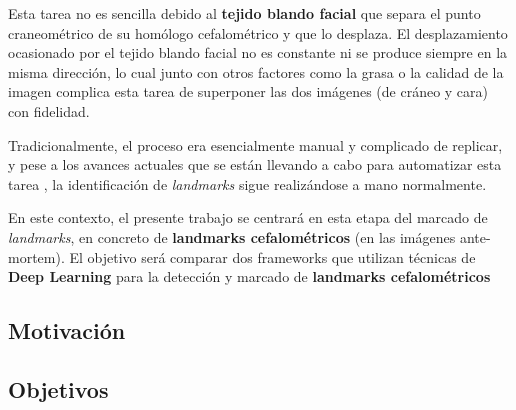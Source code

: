 \noindent Esta tarea no es sencilla debido al \textbf{tejido blando facial} que separa el punto craneométrico de su homólogo cefalométrico y que lo desplaza. El desplazamiento ocasionado por el tejido blando facial no es constante ni se produce siempre en la misma dirección, lo cual junto con otros factores como la grasa o la calidad de la imagen complica esta tarea de superponer las dos imágenes (de cráneo y cara) con fidelidad.

\medskip

\noindent Tradicionalmente, el proceso era esencialmente manual y complicado de replicar, y pese a los avances actuales que se están llevando a cabo para automatizar esta tarea \cite{Huete2015PastPA}, la identificación de \textit{landmarks} sigue realizándose a mano normalmente. 

\medskip

\noindent En este contexto, el presente trabajo se centrará en esta etapa del marcado de \textit{landmarks}, en concreto de \textbf{landmarks cefalométricos} (en las imágenes ante-mortem). El objetivo será comparar dos frameworks que utilizan técnicas de \textbf{Deep Learning} para la detección y marcado de \textbf{landmarks cefalométricos}


\subsection{Motivación}
\subsection{Objetivos}

\endinput
